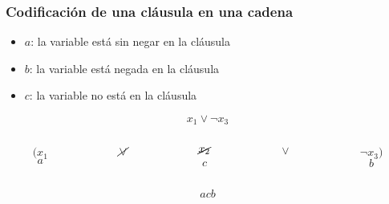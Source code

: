 \documentclass{beamer}
\begin{document}
\begin{frame}
    \frametitle{Codificación de una cláusula en una cadena}
    
    \begin{itemize}
        \item $a$: la variable está sin negar en la cláusula
              \pause
        \item $b$: la variable está negada en la cláusula
              \pause
        \item $c$: la variable no está en la cláusula
    \end{itemize}
    
    \pause
    
    
    \begin{Large}
        $$x_1\vee \neg x_3$$
        
        \pause
        
        \begin{columns}
            \begin{column}{1cm}
                $$({x_1}$$$$a$$
            \end{column}
            \pause
            \begin{column}{1cm}
                $$\cancel{\vee}$$$$\ $$
            \end{column}
            \begin{column}{1cm}
                $$\cancel{x_2}$$$$c$$
            \end{column}
            \pause
            \begin{column}{1cm}
                $$\vee$$$$\ $$
            \end{column}
            \begin{column}{1cm}
                $$\neg{x_3})$$$$b$$
            \end{column}
        \end{columns}
        
        \pause
        
        $$acb$$
    \end{Large}
    
    
\end{frame}
\end{document}
